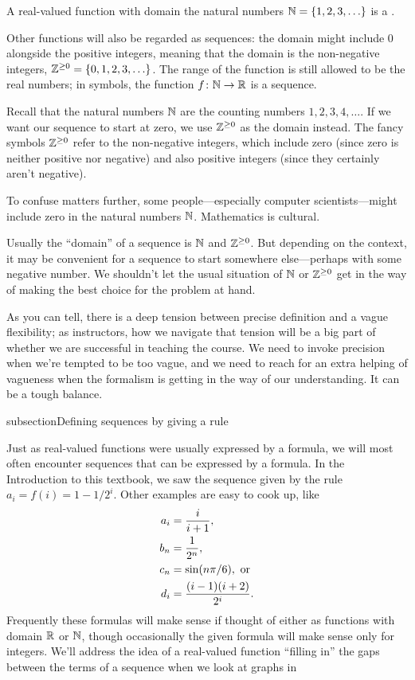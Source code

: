 \documentclass{ximera}
\begin{document}
A real-valued function with domain the natural numbers
$\mathbb N=\{1,2,3,\ldots\}$ is a .

Other functions will also be regarded as sequences: the domain might
include $0$ alongside the positive integers, meaning that the
domain is the non-negative integers, $\mathbb Z^{\ge0}=\{0,1,2,3,\ldots\}$.  The range of the function is still
allowed to be the real numbers; in symbols, the function $f\colon
\mathbb N\to\mathbb R$ is a sequence.




Recall that the natural numbers $\mathbb N$ are the counting numbers $1, 2,
3, 4, \ldots$.  If we want our sequence to start at zero, we use
$\mathbb Z^{\ge 0}$ as the domain instead.  The fancy symbols $\mathbb Z^{\ge 0}$
refer to the non-negative integers, which include zero (since zero
is neither positive nor negative) and also positive integers (since
they certainly aren't negative).

To confuse matters further, some people---especially computer
scientists---might include zero in the natural numbers $\mathbb N$.
Mathematics is cultural.


\begin{warning}
  Usually the ``domain'' of a sequence is $\mathbb N$ and $\mathbb Z^{\ge 0}$.  But
  depending on the context, it may be convenient for a sequence to
  start somewhere else---perhaps with some negative number.  We
  shouldn't let the usual situation of $\mathbb N$ or $\mathbb Z^{\ge 0}$ get in the
  way of making the best choice for the problem at hand.
\end{warning}

As you can tell, there is a deep tension between precise definition
and a vague flexibility; as instructors, how we navigate that tension
will be a big part of whether we are successful in teaching the
course.  We need to invoke precision when we're tempted to be too
vague, and we need to reach for an extra helping of vagueness when the
formalism is getting in the way of our understanding.  It can be a
tough balance.




subsection{Defining sequences by giving a rule}

Just as real-valued functions were usually expressed by a formula, we
will most often encounter sequences that can be expressed by a
formula.  In the Introduction to this textbook, we saw the sequence
given by the rule $a_i=f(i)=1-1/2^i$.  Other examples are easy to
cook up, like
\begin{align*}
  a_i &={i\over i+1}, \\
  b_n &={1\over2^n}, \\
  c_n &=\sin(n\pi/6), \mbox{ or} \\
  d_i &={(i-1)(i+2)\over2^i}. \\
\end{align*}
Frequently these formulas will make sense if thought of either as
functions with domain $\mathbb R$ or $\mathbb N$, though occasionally the given
formula will make sense only for integers.  We'll address the
idea of a real-valued function ``filling in'' the gaps between the
terms of a sequence when we look at graphs in
\end{document}
